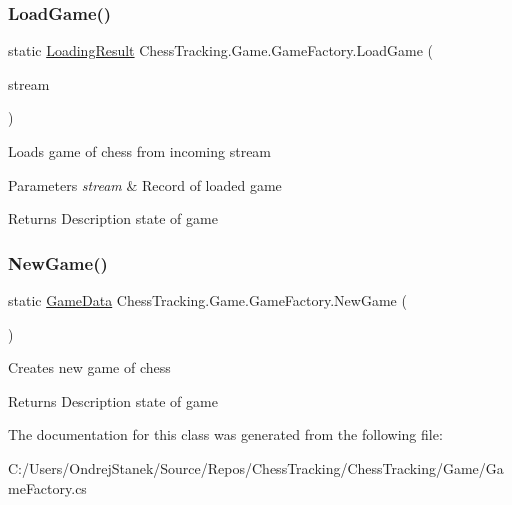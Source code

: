 \subsubsection{\texorpdfstring{LoadGame()}{LoadGame()}}
{\footnotesize\ttfamily static \mbox{\hyperlink{class_chess_tracking_1_1_game_1_1_loading_result}{Loading\+Result}} Chess\+Tracking.\+Game.\+Game\+Factory.\+Load\+Game (\begin{DoxyParamCaption}\item[{Stream\+Reader}]{stream }\end{DoxyParamCaption})\hspace{0.3cm}{\ttfamily [static]}}



Loads game of chess from incoming stream 


\begin{DoxyParams}{Parameters}
{\em stream} & Record of loaded game\\
\hline
\end{DoxyParams}
\begin{DoxyReturn}{Returns}
Description state of game
\end{DoxyReturn}
\mbox{\label{class_chess_tracking_1_1_game_1_1_game_factory_a17de3986c1f9ab34cb6184f22b48dec1}} 
\subsubsection{\texorpdfstring{NewGame()}{NewGame()}}
{\footnotesize\ttfamily static \mbox{\hyperlink{class_chess_tracking_1_1_game_1_1_game_data}{Game\+Data}} Chess\+Tracking.\+Game.\+Game\+Factory.\+New\+Game (\begin{DoxyParamCaption}{ }\end{DoxyParamCaption})\hspace{0.3cm}{\ttfamily [static]}}



Creates new game of chess 

\begin{DoxyReturn}{Returns}
Description state of game
\end{DoxyReturn}


The documentation for this class was generated from the following file\+:\begin{DoxyCompactItemize}
\item 
C\+:/\+Users/\+Ondrej\+Stanek/\+Source/\+Repos/\+Chess\+Tracking/\+Chess\+Tracking/\+Game/Game\+Factory.\+cs\end{DoxyCompactItemize}
